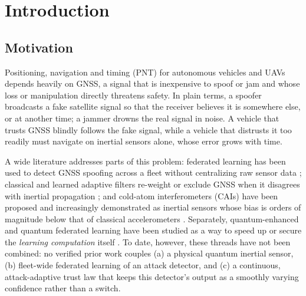 \documentclass[12pt,a4paper]{article}
\begin{document}
\newpage
\tableofcontents
\newpage
{}

\section{Introduction}

\subsection{Motivation}
Positioning, navigation and timing (PNT) for autonomous vehicles and UAVs depends heavily on GNSS, a signal that is inexpensive to spoof or jam and whose loss or manipulation directly threatens safety. In plain terms, a spoofer broadcasts a fake satellite signal so that the receiver believes it is somewhere else, or at another time; a jammer drowns the real signal in noise. A vehicle that trusts GNSS blindly follows the fake signal, while a vehicle that distrusts it too readily must navigate on inertial sensors alone, whose error grows with time.

A wide literature addresses parts of this problem: federated learning has been used to detect GNSS spoofing across a fleet without centralizing raw sensor data \cite{khan2025enhancing,chai2025navigation,liu2026g2fl,namagembe2026machine,zhou2023spatiotemporal}; classical and learned adaptive filters re-weight or exclude GNSS when it disagrees with inertial propagation \cite{mehra1970identification,carlson1988federated,carlson1990federated,ren2020adaptive,pardhasaradhi2022gps,negru2024resilient}; and cold-atom interferometers (CAIs) have been proposed and increasingly demonstrated as inertial sensors whose bias is orders of magnitude below that of classical accelerometers \cite{wright2022cold,darmagnac2024atom}. Separately, quantum-enhanced and quantum federated learning have been studied as a way to speed up or secure the \emph{learning computation} itself \cite{hazarika2025quantum,chehimi2023foundations,chehimi2022quantum}. To date, however, these threads have not been combined: no verified prior work couples (a) a physical quantum inertial sensor, (b) fleet-wide federated learning of an attack detector, and (c) a continuous, attack-adaptive trust law that keeps this detector's output as a smoothly varying confidence rather than a switch.
\end{document}
